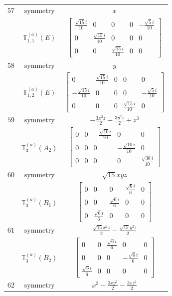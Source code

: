 \documentclass[fleqn,8pt,landscape]{jsarticle}
\begin{document}
\begin{longtable}{ccc}
$ 57 $ & $ \text{symmetry} $ & $ x $ \\
$  $ & $ \mathbb{T}_{1,1}^{(a)}(E) $ & $ \begin{bmatrix} \frac{\sqrt{15} i}{10} & 0 & 0 & 0 & - \frac{\sqrt{5} i}{10} \\ 0 & \frac{\sqrt{15} i}{10} & 0 & 0 & 0 \\ 0 & 0 & \frac{\sqrt{15} i}{10} & 0 & 0 \end{bmatrix} $ \\ \hline
$ 58 $ & $ \text{symmetry} $ & $ y $ \\
$  $ & $ \mathbb{T}_{1,2}^{(a)}(E) $ & $ \begin{bmatrix} 0 & \frac{\sqrt{15} i}{10} & 0 & 0 & 0 \\ - \frac{\sqrt{15} i}{10} & 0 & 0 & 0 & - \frac{\sqrt{5} i}{10} \\ 0 & 0 & 0 & \frac{\sqrt{15} i}{10} & 0 \end{bmatrix} $ \\ \hline
$ 59 $ & $ \text{symmetry} $ & $ - \frac{3 x^{2} z}{2} - \frac{3 y^{2} z}{2} + z^{3} $ \\
$  $ & $ \mathbb{T}_{3}^{(a)}(A_{2}) $ & $ \begin{bmatrix} 0 & 0 & - \frac{\sqrt{10} i}{10} & 0 & 0 \\ 0 & 0 & 0 & - \frac{\sqrt{10} i}{10} & 0 \\ 0 & 0 & 0 & 0 & \frac{\sqrt{30} i}{10} \end{bmatrix} $ \\ \hline
$ 60 $ & $ \text{symmetry} $ & $ \sqrt{15} x y z $ \\
$  $ & $ \mathbb{T}_{3}^{(a)}(B_{1}) $ & $ \begin{bmatrix} 0 & 0 & 0 & \frac{\sqrt{6} i}{6} & 0 \\ 0 & 0 & \frac{\sqrt{6} i}{6} & 0 & 0 \\ 0 & \frac{\sqrt{6} i}{6} & 0 & 0 & 0 \end{bmatrix} $ \\ \hline
$ 61 $ & $ \text{symmetry} $ & $ \frac{\sqrt{15} x^{2} z}{2} - \frac{\sqrt{15} y^{2} z}{2} $ \\
$  $ & $ \mathbb{T}_{3}^{(a)}(B_{2}) $ & $ \begin{bmatrix} 0 & 0 & \frac{\sqrt{6} i}{6} & 0 & 0 \\ 0 & 0 & 0 & - \frac{\sqrt{6} i}{6} & 0 \\ \frac{\sqrt{6} i}{6} & 0 & 0 & 0 & 0 \end{bmatrix} $ \\ \hline
$ 62 $ & $ \text{symmetry} $ & $ x^{3} - \frac{3 x y^{2}}{2} - \frac{3 x z^{2}}{2} $ \\

\end{longtable}
\end{document}
